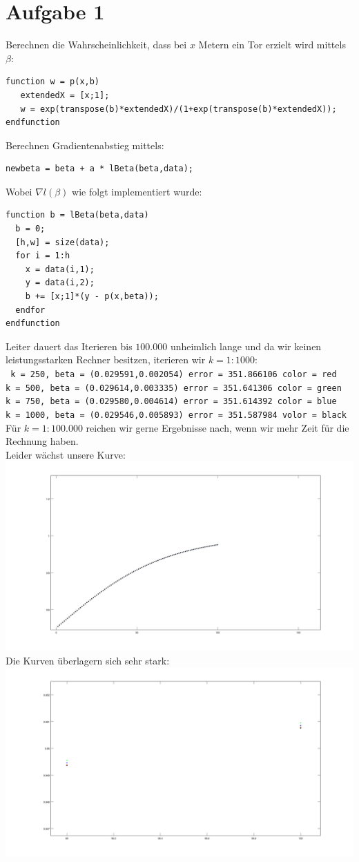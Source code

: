 \documentclass[a4paper,10pt]{article}
\begin{document}
\section{Aufgabe 1}
	Berechnen die Wahrscheinlichkeit, dass bei $x$ Metern ein Tor erzielt
	wird mittels $\beta$:
	\begin{lstlisting}
function w = p(x,b)
   extendedX = [x;1];
   w = exp(transpose(b)*extendedX)/(1+exp(transpose(b)*extendedX));
endfunction
	\end{lstlisting}
	Berechnen Gradientenabstieg mittels:
	\begin{lstlisting}
newbeta = beta + a * lBeta(beta,data);
	\end{lstlisting}
	Wobei $\nabla l(\beta)$ wie folgt implementiert wurde:
	\begin{lstlisting}
function b = lBeta(beta,data)
  b = 0;
  [h,w] = size(data);
  for i = 1:h
    x = data(i,1);
    y = data(i,2);
    b += [x;1]*(y - p(x,beta));
  endfor
endfunction
	\end{lstlisting}
	Leiter dauert das Iterieren bis $100.000$ unheimlich lange und da
	wir keinen leistungsstarken Rechner besitzen, iterieren wir $k = 1:1000$:
	\\
	\texttt{
		k = 250, beta = (0.029591,0.002054) error = 351.866106 color = red\\
		k = 500, beta = (0.029614,0.003335) error = 351.641306 color = green\\
		k = 750, beta = (0.029580,0.004614) error = 351.614392 color = blue\\
		k = 1000, beta = (0.029546,0.005893) error = 351.587984 volor = black
	}
	\\
	Für $k=1:100.000$ reichen wir gerne Ergebnisse nach, wenn wir mehr Zeit für die Rechnung haben.
	\\
	Leider wächst unsere Kurve:\\
	\includegraphics[scale=0.35]{plot1}\\
	Die Kurven überlagern sich sehr stark:\\
	\includegraphics[scale=0.35]{plot2}\\
\end{document}
